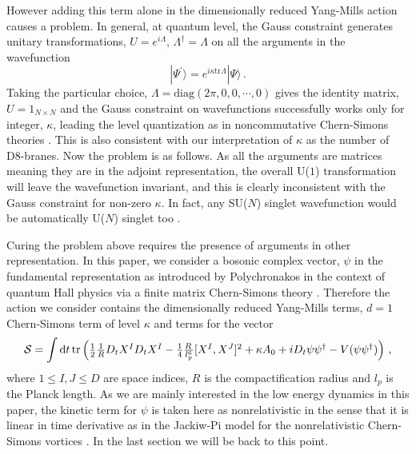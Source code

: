 \documentclass[a4paper,12pt]{article}
\def\tr{\mbox{tr}}
\def\S{{\cal S}}
\def\half{{\textstyle{\frac{1}{2}}}}
\begin{document}
However adding this term alone in  the  dimensionally reduced Yang-Mills action causes a problem. In general, at
quantum level, the Gauss constraint generates unitary transformations,
$U=e^{i\Lambda},\,\Lambda^{\dagger}=\Lambda$ on all the arguments in the wavefunction \cite{0101029}
\begin{equation}
|\Psi^{\prime}\rangle=e^{i\kappa\tr\Lambda}|\Psi\rangle\,.
\end{equation}
Taking the particular choice, $\Lambda=\mbox{diag}(2\pi,0,0,\cdots,0)$  gives the identity matrix, $U=1_{N\times
N}$ and  the Gauss constraint on wavefunctions successfully works only  for integer, $\kappa$, leading the level
quantization as in noncommutative Chern-Simons theories \cite{0102188}. This is also consistent with our
interpretation of $\kappa$ as the number of D8-branes. Now the problem is as follows. As all the arguments are
matrices meaning they are in the adjoint representation, the overall U($1$) transformation will leave the
wavefunction invariant, and this is clearly  inconsistent  with the Gauss constraint for non-zero $\kappa$. In
fact, any SU($N$) singlet wavefunction would be  automatically U($N$) singlet too \cite{9712086}.\newline



Curing the problem above requires the presence of arguments in other representation. In this paper, we consider a
bosonic complex vector, $\psi$ in the fundamental representation  as introduced by Polychronakos  in the context
of quantum Hall physics via a finite matrix Chern-Simons theory \cite{0103013}.  Therefore the action we consider
contains   the dimensionally reduced Yang-Mills terms, $d=1$ Chern-Simons term of level $\kappa$ and  terms for
the vector
\begin{equation}
\S=\displaystyle{\int{\rm
d}t}\,\tr\left(\half\textstyle{\frac{1}{R}}D_{t}X^{I}D_{t}X^{I}-\textstyle{\frac{1}{4}\frac{R\,}{l_{p}^{6}}}
[X^{I},X^{J}]^{2}+\kappa A_{0}+iD_{t}\psi\psi^{\dagger}-V(\psi\psi^{\dagger})\right)\,,
\label{action}
\end{equation}
where $1\leq I,J\leq D$ are space indices, $R$ is the compactification radius and $l_{p}$ is the  Planck length.
As we are mainly interested in the low energy dynamics in this paper,  the kinetic term for $\psi$ is taken here
as nonrelativistic in the sense that it is linear in time derivative as in the Jackiw-Pi model for the
nonrelativistic Chern-Simons vortices \cite{JackiwPi}. In the last section we will be back to this point. \newline
\end{document}
